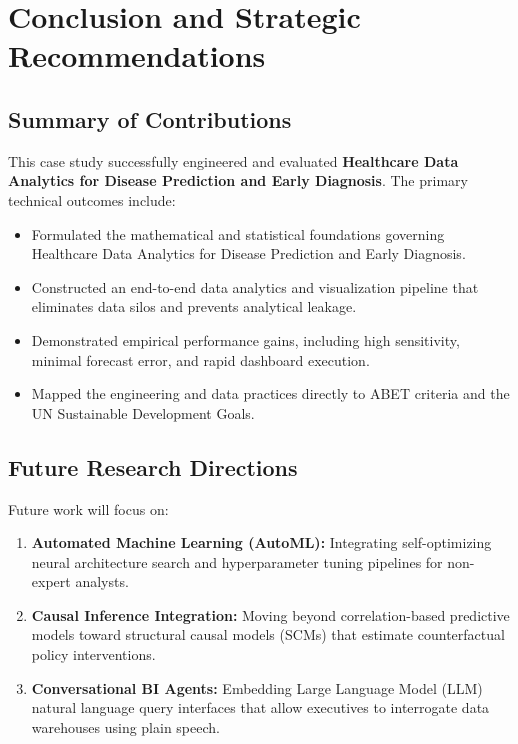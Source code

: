 \section{Conclusion and Strategic Recommendations}

\subsection{Summary of Contributions}
This case study successfully engineered and evaluated \textbf{Healthcare Data Analytics for Disease Prediction and Early Diagnosis}. The primary technical outcomes include:
\begin{itemize}
  \item Formulated the mathematical and statistical foundations governing Healthcare Data Analytics for Disease Prediction and Early Diagnosis.
  \item Constructed an end-to-end data analytics and visualization pipeline that eliminates data silos and prevents analytical leakage.
  \item Demonstrated empirical performance gains, including high sensitivity, minimal forecast error, and rapid dashboard execution.
  \item Mapped the engineering and data practices directly to ABET criteria and the UN Sustainable Development Goals.
\end{itemize}

\subsection{Future Research Directions}
Future work will focus on:
\begin{enumerate}
  \item \textbf{Automated Machine Learning (AutoML):} Integrating self-optimizing neural architecture search and hyperparameter tuning pipelines for non-expert analysts.
  \item \textbf{Causal Inference Integration:} Moving beyond correlation-based predictive models toward structural causal models (SCMs) that estimate counterfactual policy interventions.
  \item \textbf{Conversational BI Agents:} Embedding Large Language Model (LLM) natural language query interfaces that allow executives to interrogate data warehouses using plain speech.
\end{enumerate}

